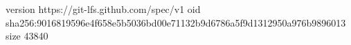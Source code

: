 version https://git-lfs.github.com/spec/v1
oid sha256:9016819596e4f658e5b5036bd00e71132b9d6786a5f9d1312950a976b9896013
size 43840
